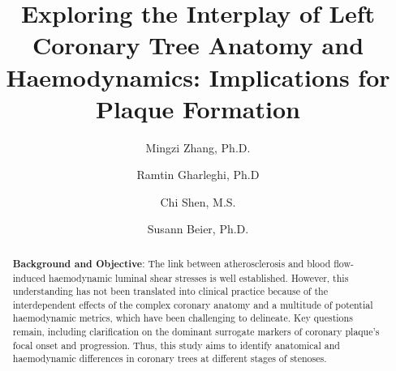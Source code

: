 \documentclass[preprint,11pt,review]{elsarticle}
\begin{document}
\begin{frontmatter}



\title{\textbf{Exploring the Interplay of Left Coronary Tree Anatomy and Haemodynamics: Implications for Plaque Formation}}


\author[label1]{Mingzi Zhang, Ph.D.}
\author[label1]{Ramtin Gharleghi, Ph.D}
\author[label1]{Chi Shen, M.S.}
\author[label1]{Susann Beier, Ph.D.}
            

            

\begin{abstract}

\textbf{Background and Objective}: The link between atherosclerosis and blood flow-induced haemodynamic luminal shear stresses is well established. However, this understanding has not been translated into clinical practice because of the interdependent effects of the complex coronary anatomy and a multitude of potential haemodynamic metrics, which have been challenging to delineate. Key questions remain, including clarification on the dominant surrogate markers of coronary plaque's focal onset and progression. Thus, this study aims to identify anatomical and haemodynamic differences in coronary trees at different stages of stenoses.


\end{abstract}
\end{frontmatter}
\end{document}
